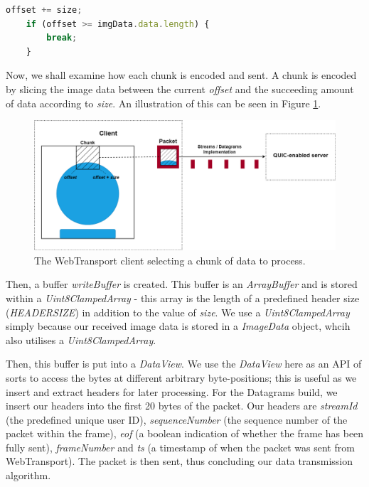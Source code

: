 \begin{lstlisting}[language=javascript, caption={Second part of functionality that exits loop when full frame is sent.}, label=lst:second_stage]
    offset += size;
    if (offset >= imgData.data.length) { 
        break;
    }
\end{lstlisting}

Now, we shall examine how each chunk is encoded and sent. A chunk is encoded by slicing the image data between the current \textit{offset} and the succeeding amount of data according to \textit{size}. An illustration of this can be seen in Figure \ref{wt_sending_chunkoffset}.

\begin{figure}[h]
    \centering
    \includegraphics[width=0.95\linewidth]{images/how chunk is selected.png}
	\caption{The WebTransport client selecting a chunk of data to process.}
    \label{wt_sending_chunkoffset}
\end{figure}

Then, a buffer \textit{writeBuffer} is created. This buffer is an \textit{ArrayBuffer} and is stored within a \textit{Uint8ClampedArray} - this array is the length of a predefined header size (\textit{HEADERSIZE}) in addition to the value of \textit{size}. We use a \textit{Uint8ClampedArray} simply because our received image data is stored in a \textit{ImageData} object, whcih also utilises a \textit{Uint8ClampedArray}.

Then, this buffer is put into a \textit{DataView}. We use the \textit{DataView} here as an API of sorts to access the bytes at different arbitrary byte-positions; this is useful as we insert and extract headers for later processing. For the Datagrams build, we insert our headers into the first 20 bytes of the packet. Our headers are \textit{streamId} (the predefined unique user ID), \textit{sequenceNumber} (the sequence number of the packet within the frame), \textit{eof} (a boolean indication of whether the frame has been fully sent), \textit{frameNumber} and \textit{ts} (a timestamp of when the packet was sent from WebTransport). The packet is then sent, thus concluding our data transmission algorithm. 

